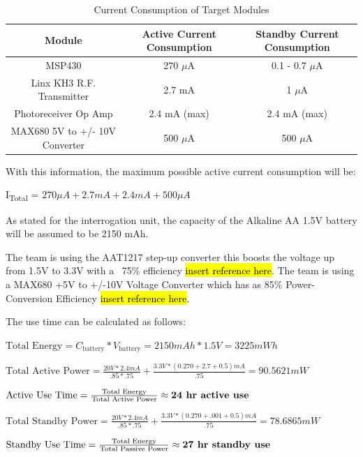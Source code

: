 \documentclass[letterpaper,10pt]{article}
\begin{document}
\begin{spacing}{1.15}
\begin{table}[htbp]
	\centering
	\begin{tabular}{c|c|c}	%
		\toprule	%
		Module & Active Current Consumption & Standby Current Consumption\\
		\midrule
		MSP430 & 270 $\mu$A & 0.1 - 0.7 $\mu$A\\ 
		Linx KH3 R.F. Transmitter & 2.7 mA & 1 $\mu$A\\
		Photoreceiver Op Amp & 2.4 mA (max) & 2.4 mA (max) \\
		MAX680 5V to +/- 10V Converter & 500 $\mu$A  & 500 $\mu$A \\
		\bottomrule	%
	\end{tabular}%
	\caption{Current Consumption of Target Modules}
	\label{tab:table2}	%
\end{table}%

With this information, the maximum possible active current consumption will be:
\begin{center}{I\textsubscript{Total} = $270 \mu A + 2.7 mA + 2.4 mA + 500 \mu A$}\end{center}

As stated for the interrogation unit, the capacity of the Alkaline AA 1.5V battery will be assumed to be 2150 mAh. 

The team is using the AAT1217 step-up converter this boosts the voltage up from 1.5V to 3.3V with a ~75\% efficiency \hl{insert reference here}. The team is using a MAX680 +5V to +/-10V Voltage Converter which has as 85\% Power-Conversion Efficiency  \hl{insert reference here}. 

The use time can be calculated as follows:

\begin{center} 
	$\textrm{Total Energy} = C_\textrm{battery} * V_\textrm{battery} = 2150 mAh * 1.5V = 3225 mWh$
	
	$\textrm{Total Active Power} = \frac{20V * 2.4 mA}{.85 * .75} + \frac{3.3 V * (0.270 + 2.7 + 0.5) mA}{.75} = 90.5621 mW$
	
	$\textrm{Active Use Time} = \frac{\textrm{Total Energy}}{\textrm{Total Active Power}} \approx \textrm{\textbf{24 hr active use}}$
	
	$\textrm{Total Standby Power} = \frac{20V * 2.4 mA}{.85 * .75} + \frac{3.3 V * (0.270 + .001 + 0.5) mA}{.75} = 78.6865 mW$
	
	$\textrm{Standby Use Time} = \frac{\textrm{Total Energy}}{\textrm{Total Passive Power}} \approx \textrm{\textbf{27 hr standby use}}$
\end{center}


\end{spacing}
\end{document}
